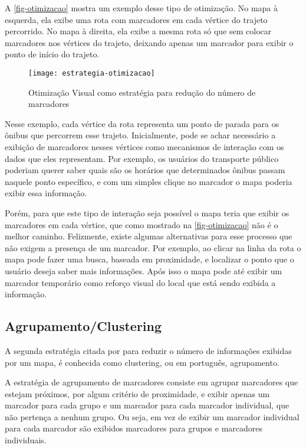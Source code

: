 	A \autoref{fig-otimizacao} mostra um exemplo desse tipo de otimização. No mapa à esquerda, ela exibe uma rota com marcadores em cada vértice do trajeto percorrido. No mapa à direita, ela exibe a mesma rota só que sem colocar marcadores nos vértices do trajeto, deixando apenas um marcador para exibir o ponto de início do trajeto.
	
	 \begin{figure}[htb]
	\caption{\label{fig-otimizacao}Otimização Visual como estratégia para redução do número de marcadores}
	\begin{center}
	    \texttt{[image: estrategia-otimizacao]}
	\end{center}	

	\end{figure}
	
	Nesse exemplo, cada vértice da rota representa um ponto de parada para os ônibus que percorrem esse trajeto. Inicialmente, pode se achar necessário a exibição de marcadores nesses vértices como mecanismos de interação com os dados que eles representam. Por exemplo, os usuários do transporte público poderiam querer saber quais são os horários que determinados ônibus passam naquele ponto específico, e com um simples clique no marcador o mapa poderia exibir essa informação. 
	
	Porém, para que este tipo de interação seja possível o mapa teria que exibir os marcadores em cada vértice, que como mostrado na \autoref{fig-otimizacao} não é o melhor caminho. Felizmente, existe algumas alternativas para esse processo que não exigem a presença de um marcador. Por exemplo, ao clicar na linha da rota o mapa pode fazer uma busca, baseada em proximidade, e localizar o ponto que o usuário deseja saber mais informações. Após isso o mapa pode até exibir um marcador temporário como reforço visual do local que está sendo exibida a informação.
	

  \subsection{Agrupamento/Clustering\label{secagrupamento}}
  A segunda estratégia citada por \cite[capítulo~9]{livroGoogleApiV3} para reduzir o número de informações exibidas por um mapa, é conhecida como clustering, ou em português, agrupamento.
  
  A estratégia de agrupamento de marcadores consiste em agrupar marcadores que estejam próximos, por algum critério de proximidade, e exibir apenas um marcador para cada grupo e um marcador para cada marcador individual, que não pertença a nenhum grupo. Ou seja, em vez de exibir um marcador individual para cada marcador são exibidos marcadores para grupos e marcadores individuais. 
  
